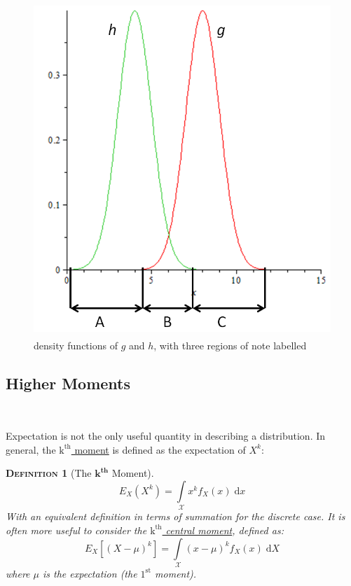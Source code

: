 \documentclass[12pt,a4paper]{article}
\newtheorem{definition}{\textsc{Definition}}[section]
\begin{document}
\begin{figure}[h]
\begin{center}
\includegraphics[height=12.6cm,width=11.44cm]{M2S1 Importance Sampling.png}
\caption{density functions of $g$ and $h$, with three regions of note labelled}\label{importance sampling}
\end{center}
\end{figure}

\subsection{Higher Moments}$\;$

Expectation is not the only useful quantity in describing a distribution. In general, the \underline{$\mathrm{k^{th}}$ moment} is defined as the expectation of $X^k$:

\begin{definition}[The $\mathbf{k^{th}}$ Moment]
$$E_{X}(X^k) = \int\limits_{\mathcal{X}}\! x^k f_X(x) \;\mathrm{d}x$$
With an equivalent definition in terms of summation for the discrete case.
It is often more useful to consider the \underline{$\mathrm{k^{th}}$ central moment}, defined as:
$$E_{X}[(X - \mu)^k] = \int\limits_{\mathcal{X}}\! (x - \mu)^k f_X(x)\;\mathrm{d}X$$
where $\mu$ is the expectation (the $\mathrm{1^{st}}$ moment).
\end{definition}
\end{document}

